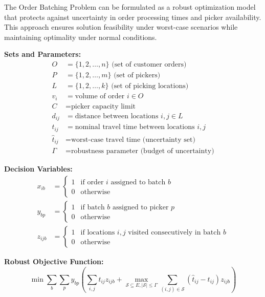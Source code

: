 \documentclass{article}
\begin{document}
The Order Batching Problem can be formulated as a robust optimization model that protects against uncertainty in order processing times and picker availability. This approach ensures solution feasibility under worst-case scenarios while maintaining optimality under normal conditions.

\textbf{Sets and Parameters:}
\begin{align}
O &= \{1, 2, \ldots, n\} \text{ (set of customer orders)} \\
P &= \{1, 2, \ldots, m\} \text{ (set of pickers)} \\
L &= \{1, 2, \ldots, k\} \text{ (set of picking locations)} \\
v_i &= \text{volume of order } i \in O \\
C &= \text{picker capacity limit} \\
d_{ij} &= \text{distance between locations } i, j \in L \\
t_{ij} &= \text{nominal travel time between locations } i, j \\
\hat{t}_{ij} &= \text{worst-case travel time (uncertainty set)} \\
\Gamma &= \text{robustness parameter (budget of uncertainty)}
\end{align}

\textbf{Decision Variables:}
\begin{align}
x_{ib} &= \begin{cases} 1 & \text{if order } i \text{ assigned to batch } b \\ 0 & \text{otherwise} \end{cases} \\
y_{bp} &= \begin{cases} 1 & \text{if batch } b \text{ assigned to picker } p \\ 0 & \text{otherwise} \end{cases} \\
z_{ijb} &= \begin{cases} 1 & \text{if locations } i, j \text{ visited consecutively in batch } b \\ 0 & \text{otherwise} \end{cases}
\end{align}

\textbf{Robust Objective Function:}
\begin{equation}
\min \sum_{b} \sum_{p} y_{bp} \left( \sum_{i,j} t_{ij} z_{ijb} + \max_{\mathcal{S} \subseteq E, |\mathcal{S}| \leq \Gamma} \sum_{(i,j) \in \mathcal{S}} (\hat{t}_{ij} - t_{ij}) z_{ijb} \right)
\end{equation}
\end{document}
